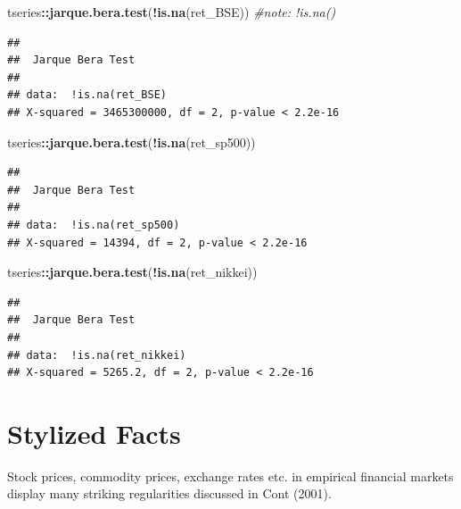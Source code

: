 \documentclass[11pt,]{article}
\newenvironment{Shaded}{\begin{snugshade}}{\end{snugshade}}
\newcommand{\KeywordTok}[1]{\textcolor[rgb]{0.13,0.29,0.53}{\textbf{#1}}}
\newcommand{\CommentTok}[1]{\textcolor[rgb]{0.56,0.35,0.01}{\textit{#1}}}
\newcommand{\OperatorTok}[1]{\textcolor[rgb]{0.81,0.36,0.00}{\textbf{#1}}}
\newcommand{\NormalTok}[1]{#1}
\begin{document}
\begin{Shaded}
\begin{Highlighting}[]
\NormalTok{tseries}\OperatorTok{::}\KeywordTok{jarque.bera.test}\NormalTok{(}\OperatorTok{!}\KeywordTok{is.na}\NormalTok{(ret_BSE)) }\CommentTok{#note: !is.na()}
\end{Highlighting}
\end{Shaded}

\begin{verbatim}
## 
##  Jarque Bera Test
## 
## data:  !is.na(ret_BSE)
## X-squared = 3465300000, df = 2, p-value < 2.2e-16
\end{verbatim}

\begin{Shaded}
\begin{Highlighting}[]
\NormalTok{tseries}\OperatorTok{::}\KeywordTok{jarque.bera.test}\NormalTok{(}\OperatorTok{!}\KeywordTok{is.na}\NormalTok{(ret_sp500))}
\end{Highlighting}
\end{Shaded}

\begin{verbatim}
## 
##  Jarque Bera Test
## 
## data:  !is.na(ret_sp500)
## X-squared = 14394, df = 2, p-value < 2.2e-16
\end{verbatim}

\begin{Shaded}
\begin{Highlighting}[]
\NormalTok{tseries}\OperatorTok{::}\KeywordTok{jarque.bera.test}\NormalTok{(}\OperatorTok{!}\KeywordTok{is.na}\NormalTok{(ret_nikkei))}
\end{Highlighting}
\end{Shaded}

\begin{verbatim}
## 
##  Jarque Bera Test
## 
## data:  !is.na(ret_nikkei)
## X-squared = 5265.2, df = 2, p-value < 2.2e-16
\end{verbatim}

\section{Stylized Facts}\label{stylized-facts}

Stock prices, commodity prices, exchange rates etc. in empirical
financial markets display many striking regularities discussed in Cont
(2001).
\end{document}
